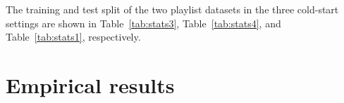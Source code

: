 The training and test split of the two playlist datasets in the three cold-start settings are shown in 
Table~\ref{tab:stats3}, Table~\ref{tab:stats4}, and Table~\ref{tab:stats1}, respectively.



\clearpage
\newpage

\section{Empirical results}


%


\clearpage
\newpage


